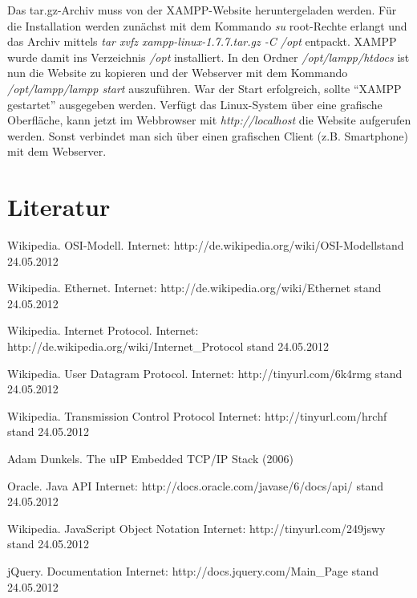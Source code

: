 \documentclass[a4paper,14pt,headsepline]{scrartcl}
\begin{document}
Das tar.gz-Archiv muss von der XAMPP-Website heruntergeladen werden. Für die Installation werden zunächst mit dem Kommando \textit{su} root-Rechte erlangt und das Archiv mittels \textit{tar xvfz xampp-linux-1.7.7.tar.gz -C /opt} entpackt. XAMPP wurde damit ins Verzeichnis \textit{/opt} installiert. In den Ordner \linebreak \textit{/opt/lampp/htdocs} ist nun die Website zu kopieren und der Webserver mit dem Kommando \textit{/opt/lampp/lampp start} auszuführen. War der Start erfolgreich, sollte ``XAMPP gestartet'' ausgegeben werden. Verfügt das Linux-System über eine grafische Oberfläche, kann jetzt im Webbrowser mit \textit{http://localhost} die Website aufgerufen werden. Sonst verbindet man sich über einen grafischen Client (z.B. Smartphone) mit dem Webserver.

\newpage
\section{Literatur}
Wikipedia. OSI-Modell.\newline
Internet: http://de.wikipedia.org/wiki/OSI-Modellstand 24.05.2012

Wikipedia. Ethernet.\newline
Internet: http://de.wikipedia.org/wiki/Ethernet stand 24.05.2012

Wikipedia. Internet Protocol.\newline
Internet: http://de.wikipedia.org/wiki/Internet\_Protocol stand 24.05.2012

Wikipedia. User Datagram Protocol.\newline
Internet: http://tinyurl.com/6k4rmg stand 24.05.2012

Wikipedia. Transmission Control Protocol\newline
Internet: http://tinyurl.com/hrchf stand 24.05.2012

Adam Dunkels. The uIP Embedded TCP/IP Stack (2006)

Oracle. Java API\newline
Internet: http://docs.oracle.com/javase/6/docs/api/ stand 24.05.2012

Wikipedia. JavaScript Object Notation\newline
Internet: http://tinyurl.com/249jswy stand 24.05.2012

jQuery. Documentation\newline
Internet: http://docs.jquery.com/Main\_Page stand 24.05.2012
\end{document}
